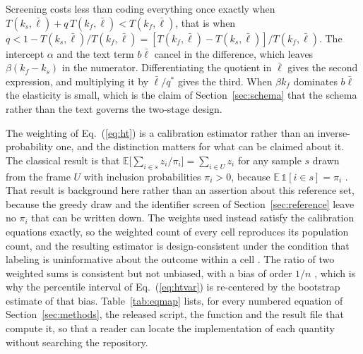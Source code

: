 \begin{pf}
Screening costs less than coding everything once exactly when
$T(k_s, \bar{\ell}) + q\,T(k_f, \bar{\ell}) < T(k_f, \bar{\ell})$, that is when
$q < 1 - T(k_s, \bar{\ell})/T(k_f, \bar{\ell}) = [T(k_f, \bar{\ell}) - T(k_s, \bar{\ell})]/T(k_f, \bar{\ell})$.
The intercept $\alpha$ and the text term $b\bar{\ell}$ cancel in the difference, which leaves
$\beta(k_f - k_s)$ in the numerator. Differentiating the quotient in $\bar{\ell}$ gives the
second expression, and multiplying it by $\bar{\ell}/q^{*}$ gives the third. When
$\beta k_f$ dominates $b\bar{\ell}$ the elasticity is small, which is the claim of
Section~\ref{sec:schema} that the schema rather than the text governs the two-stage design.
\end{pf}

The weighting of Eq.~(\ref{eq:ht}) is a calibration estimator rather than an inverse-probability
one, and the distinction matters for what can be claimed about it. The classical result is that
$\mathbb{E}\bigl[\sum_{i \in s} z_i/\pi_i\bigr] = \sum_{i \in U} z_i$ for any sample $s$ drawn
from the frame $U$ with inclusion probabilities $\pi_i > 0$, because
$\mathbb{E}\,\mathbb{1}[i \in s] = \pi_i$ \citep{horvitz1952generalization}. That result is
background here rather than an assertion about this reference set, because the greedy draw and
the identifier screen of Section~\ref{sec:reference} leave no $\pi_i$ that can be written down.
The weights used instead satisfy the calibration equations exactly, so the weighted count of
every cell reproduces its population count, and the resulting estimator is design-consistent
under the condition that labeling is uninformative about the outcome within a cell
\citep{deville1992calibration}. The ratio of two weighted sums is consistent but not unbiased,
with a bias of order $1/n$ \citep{sarndal1992model}, which is why the percentile interval of
Eq.~(\ref{eq:htvar}) is re-centered by the bootstrap estimate of that bias. Table~\ref{tab:eqmap} lists, for every numbered equation of
Section~\ref{sec:methods}, the released script, the function and the result file that compute
it, so that a reader can locate the implementation of each quantity without searching the
repository.



